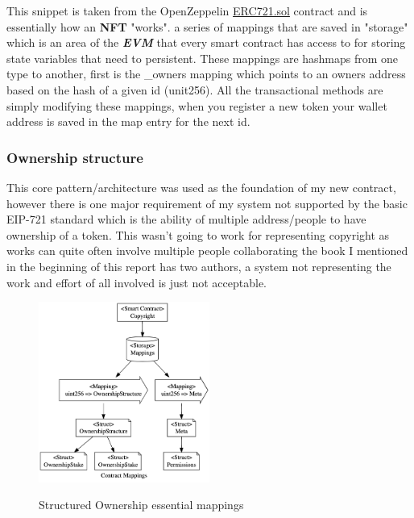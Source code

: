 \documentclass[12pt]{article}
\newcommand{\keyword}[1]{\textbf{\textit{#1}}}
\begin{document}
This snippet is taken from the OpenZeppelin \href{https://github.com/OpenZeppelin/openzeppelin-contracts/blob/master/contracts/token/ERC721/ERC721.sol}{ERC721.sol} contract and is essentially how an \textbf{NFT} "works". a series of mappings that are saved in "storage" which is an area of the \keyword{EVM} that every smart contract has access to for storing state variables that need to persistent. These mappings are hashmaps from one type to another, first is the \_owners mapping which points to an owners address based on the hash of a given id (unit256). All the transactional methods are simply modifying these mappings, when you register a new token your wallet address is saved in the map entry for the next id.

\subsubsection{Ownership structure}

This core pattern/architecture was used as the foundation of my new contract, however there is one major requirement of my system not supported by the basic EIP-721 standard which is the ability of multiple address/people to have ownership of a token. This wasn't going to work for representing copyright as works can quite often involve multiple people collaborating the book I mentioned in the beginning of this report\cite{blockchain_revolution} has two authors, a system not representing the work and effort of all involved is just not acceptable.

\begin{figure}[H]
\caption{Structured Ownership essential mappings}
\centering
\includegraphics[width=0.5\textwidth,height=0.5\textheight,keepaspectratio]{images/operational/mappings.png}
\label{fig:float}
\end{figure}
\end{document}
